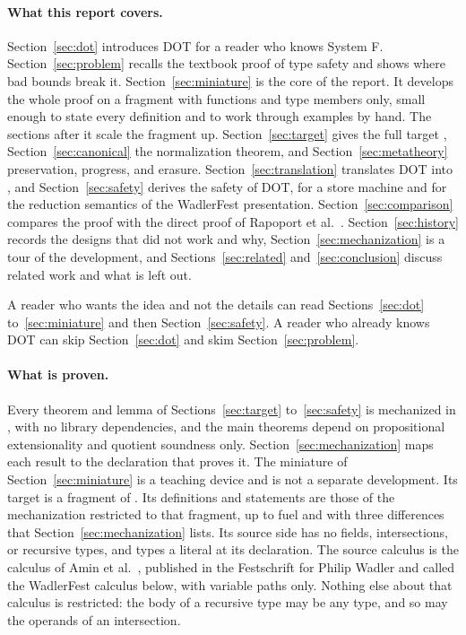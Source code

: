 \paragraph{What this report covers.}
Section~\ref{sec:dot} introduces DOT for a reader who knows System F. Section~\ref{sec:problem} recalls the textbook proof of type safety and shows where bad bounds break it. Section~\ref{sec:miniature} is the core of the report. It develops the whole proof on a fragment with functions and type members only, small enough to state every definition and to work through examples by hand. The sections after it scale the fragment up. Section~\ref{sec:target} gives the full target \FCdot, Section~\ref{sec:canonical} the normalization theorem, and Section~\ref{sec:metatheory} preservation, progress, and erasure. Section~\ref{sec:translation} translates DOT into \FCdot, and Section~\ref{sec:safety} derives the safety of DOT, for a store machine and for the reduction semantics of the WadlerFest presentation. Section~\ref{sec:comparison} compares the proof with the direct proof of Rapoport et al.\ \cite{rapoport2017simple}. Section~\ref{sec:history} records the designs that did not work and why, Section~\ref{sec:mechanization} is a tour of the \Lean development, and Sections~\ref{sec:related} and~\ref{sec:conclusion} discuss related work and what is left out.

A reader who wants the idea and not the details can read Sections~\ref{sec:dot} to~\ref{sec:miniature} and then Section~\ref{sec:safety}. A reader who already knows DOT can skip Section~\ref{sec:dot} and skim Section~\ref{sec:problem}.

\paragraph{What is proven.}
Every theorem and lemma of Sections~\ref{sec:target} to~\ref{sec:safety} is mechanized in \Lean, with no library dependencies, and the main theorems depend on propositional extensionality and quotient soundness only. Section~\ref{sec:mechanization} maps each result to the declaration that proves it. The miniature of Section~\ref{sec:miniature} is a teaching device and is not a separate development. Its target is a fragment of \FCdot. Its definitions and statements are those of the mechanization restricted to that fragment, up to fuel and with three differences that Section~\ref{sec:mechanization} lists. Its source side has no fields, intersections, or recursive types, and types a literal at its declaration. The source calculus is the calculus of Amin et al.\ \cite{amin2016essence}, published in the Festschrift for Philip Wadler and called the WadlerFest calculus below, with variable paths only. Nothing else about that calculus is restricted: the body of a recursive type may be any type, and so may the operands of an intersection.

